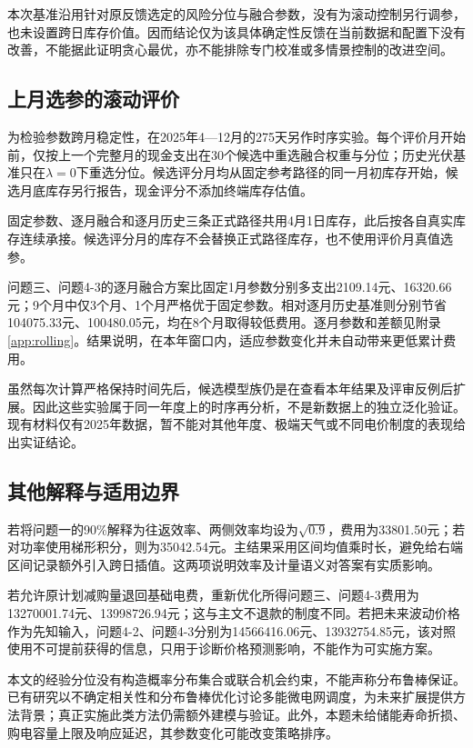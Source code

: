本次基准沿用针对原反馈选定的风险分位与融合参数，没有为滚动控制另行调参，也未设置跨日库存价值。因而结论仅为该具体确定性反馈在当前数据和配置下没有改善，不能据此证明贪心最优，亦不能排除专门校准或多情景控制的改进空间。

\subsection{上月选参的滚动评价}
为检验参数跨月稳定性，在2025年4—12月的275天另作时序实验。每个评价月开始前，仅按上一个完整月的现金支出在30个候选中重选融合权重与分位；历史光伏基准只在$\lambda=0$下重选分位。候选评分月均从固定参考路径的同一月初库存开始，候选月底库存另行报告，现金评分不添加终端库存估值。

固定参数、逐月融合和逐月历史三条正式路径共用4月1日库存，此后按各自真实库存连续承接。候选评分月的库存不会替换正式路径库存，也不使用评价月真值选参。

问题三、问题4-3的逐月融合方案比固定1月参数分别多支出2109.14元、16320.66元；9个月中仅3个月、1个月严格优于固定参数。相对逐月历史基准则分别节省104075.33元、100480.05元，均在8个月取得较低费用。逐月参数和差额见附录\ref{app:rolling}。结果说明，在本年窗口内，适应参数变化并未自动带来更低累计费用。

虽然每次计算严格保持时间先后，候选模型族仍是在查看本年结果及评审反例后扩展。因此这些实验属于同一年度上的时序再分析，不是新数据上的独立泛化验证。现有材料仅有2025年数据，暂不能对其他年度、极端天气或不同电价制度的表现给出实证结论。

\subsection{其他解释与适用边界}
若将问题一的90\%解释为往返效率、两侧效率均设为$\sqrt{0.9}$，费用为33801.50元；若对功率使用梯形积分，则为35042.54元。主结果采用区间均值乘时长，避免给右端区间记录额外引入跨日插值。这两项说明效率及计量语义对答案有实质影响。

若允许原计划减购量退回基础电费，重新优化所得问题三、问题4-3费用为13270001.74元、13998726.94元；这与主文不退款的制度不同。若把未来波动价格作为先知输入，问题4-2、问题4-3分别为14566416.06元、13932754.85元，该对照使用不可提前获得的信息，只用于诊断价格预测影响，不能作为可实施方案。

本文的经验分位没有构造概率分布集合或联合机会约束，不能声称分布鲁棒保证。已有研究以不确定相关性和分布鲁棒优化讨论多能微电网调度\cite{li2025dro}，为未来扩展提供方法背景；真正实施此类方法仍需额外建模与验证。此外，本题未给储能寿命折损、购电容量上限及响应延迟，其参数变化可能改变策略排序。
\FloatBarrier


